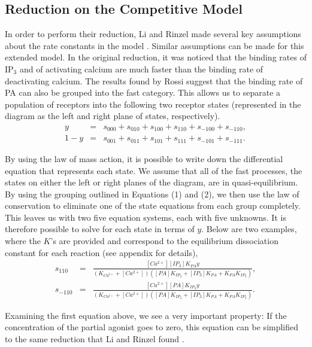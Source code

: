 \documentclass[preprint,12pt]{elsarticle}
\begin{document}
\subsection{Reduction on the Competitive Model}
In order to perform their reduction, Li and Rinzel made several key assumptions about the rate constants in the model \cite{li}. Similar assumptions can be made for this extended model. In the original reduction, it was noticed that the binding rates of IP$_3$ and of activating calcium are much faster than the binding rate of deactivating calcium. The results found by Rossi suggest that the binding rate of PA can also be grouped into the fast category. This allows us to separate a population of receptors into the following two receptor states (represented in the diagram as the left and right plane of states, respectively).  
\begin{eqnarray}
	y &=& s_{000} + s_{010} + s_{100} + s_{110} + s_{-100} +s_{-110},   \label{eqn:y}\\
	1-y &=& s_{001} + s_{011} + s_{101} + s_{111} + s_{-101} +s_{-111}. \label{eqn:1-y}
\end{eqnarray}

By using the law of mass action, it is possible to write down the differential equation that  represents each state. We assume that all of the fast processes, the states on either the left or right planes of the diagram, are in quasi-equilibrium. By using the grouping outlined in Equations (1) and (2), we then use the law of conservation to eliminate one of the state equations from each group completely. This leaves us with two five equation systems, each with five unknowns. It is therefore possible to solve for each state in terms of $y$. Below are two examples, where the $K$'s are provided and correspond to the equilibrium dissociation constant for each reaction (see appendix for details),
\begin{eqnarray}
	s_{110} &=& \frac{[Ca^{2+}][IP_3]K_{PA}y}{(K_{Ca^{2+}}+[Ca^{2+}])([PA]K_{IP_3}+[IP_3]K_{PA}+K_{PA}K_{IP_3})},   \label{eqn:s110}\\
	s_{-110} &=& \frac{[Ca^{2+}][PA]K_{IP_3}y}{(K_{Ca^{2+}}+[Ca^{2+}])([PA]K_{IP_3}+[IP_3]K_{PA}+K_{PA}K_{IP_3})}.   \label{eqn:s-110}
\end{eqnarray}

Examining the first equation above, we see a very important property: If the concentration of the partial agonist goes to zero, this equation can be simplified to the same reduction that Li and Rinzel found \cite{li}.   
 
\end{document}
